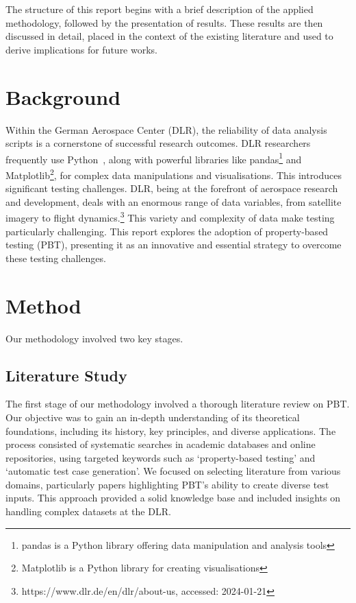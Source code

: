 \documentclass[runningheads]{llncs}
\begin{document}
The structure of this report begins with a brief description of the applied methodology, followed by the presentation of results. These results are then discussed in detail, placed in the context of the existing literature and used to derive implications for future works.

\section{Background}
Within the German Aerospace Center (DLR), the reliability of data analysis scripts is a cornerstone of successful research outcomes. DLR researchers frequently use Python~\cite{Kurnatowski2020}, along with powerful libraries like pandas\footnote{pandas is a Python library offering data manipulation and analysis tools} and Matplotlib\footnote{Matplotlib is a Python library for creating visualisations}, for complex data manipulations and visualisations. This introduces significant testing challenges. DLR, being at the forefront of aerospace research and development, deals with an enormous range of data variables, from satellite imagery to flight dynamics.\footnote{https://www.dlr.de/en/dlr/about-us, accessed: 2024-01-21} This variety and complexity of data make testing particularly challenging. This report explores the adoption of property-based testing (PBT), presenting it as an innovative and essential strategy to overcome these testing challenges.

\section{Method}
Our methodology involved two key stages.

\subsection{Literature Study}
The first stage of our methodology involved a thorough literature review on PBT. Our objective was to gain an in-depth understanding of its theoretical foundations, including its history, key principles, and diverse applications. The process consisted of systematic searches in academic databases and online repositories, using targeted keywords such as `property-based testing' and `automatic test case generation'. We focused on selecting literature from various domains, particularly papers highlighting PBT's ability to create diverse test inputs. This approach provided a solid knowledge base and included insights on handling complex datasets at the DLR.
\end{document}
